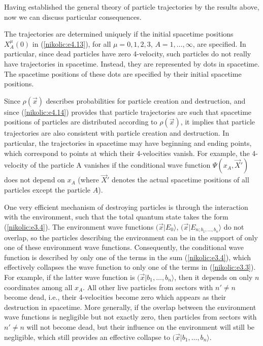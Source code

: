 \documentclass[12pt,twoside]{report} %
\begin{document}
Having established the general theory of particle trajectories by the results above, 
now we can discuss particular consequences. 

The trajectories are determined uniquely if the initial spacetime positions
$X^{\mu}_A(0)$ in (\ref{nikolic:e4.13}), for all $\mu=0,1,2,3$, $A=1,\ldots, \infty$,
are specified. In particular,
since dead particles have zero 4-velocity, such particles do not really have trajectories
in spacetime. Instead, they are represented by dots in spacetime.
The spacetime positions of these dots are 
specified by their initial spacetime positions.

Since $\rho(\vec{x})$ describes probabilities for particle creation and destruction, 
and since (\ref{nikolic:e4.14}) provides that particle trajectories are such that 
spacetime positions of particles
are distributed according to $\rho(\vec{x})$, it implies that particle trajectories are
also consistent with particle creation and destruction. In particular, the trajectories
in spacetime may have beginning and ending points, which correspond to points
at which their 4-velocities vanish. For example,
the 4-velocity of the particle A vanishes if the conditional wave function
$\Psi(x_A,\vec{X}')$ does not depend on $x_A$ (where $\vec{X}'$ denotes
the actual spacetime positions of all particles except the particle $A$).

One very efficient mechanism of destroying particles is through the interaction
with the environment, such that the total quantum state takes the form 
(\ref{nikolic:e3.4}). The environment wave functions
$(\vec{x}|E_0\rangle$, $(\vec{x}|E_{n;b_1,\ldots,b_n} \rangle$ do not overlap,
so the particles describing the environment can be in the support of only one of these
environment wave functions. Consequently, the conditional wave function
is described by only one of the terms in the sum (\ref{nikolic:e3.4}), which effectively
collapses the wave function to only one of the terms in (\ref{nikolic:e3.3}). For example,
if the latter wave function is $(\vec{x}|b_1,\ldots,b_n \rangle$, then it depends on only
$n$ coordinates among all $x_A$. All other live particles from sectors with
$n'\neq n$ become dead, i.e., their 4-velocities become zero which appears as
their destruction in spacetime.
More generally, if the overlap between the environment wave functions is negligible 
but not exactly zero, then particles from sectors with
$n'\neq n$ will not become dead, but their influence on the environment will still be
negligible, which still provides an effective collapse to $(\vec{x}|b_1,\ldots,b_n \rangle$.
\end{document}

